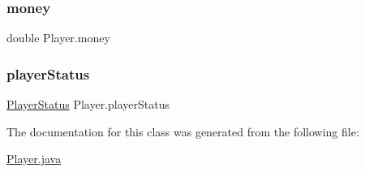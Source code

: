 \mbox{\label{class_player_a80b07966d9359181ae196aa4179930a5}} 
\subsubsection{\texorpdfstring{money}{money}}
{\footnotesize\ttfamily double Player.\+money\hspace{0.3cm}{\ttfamily [private]}}

\mbox{\label{class_player_a022b57fd4b98752acacbbc5d1ec35e45}} 
\subsubsection{\texorpdfstring{player\+Status}{playerStatus}}
{\footnotesize\ttfamily \mbox{\hyperlink{enum_player_1_1_player_status}{Player\+Status}} Player.\+player\+Status\hspace{0.3cm}{\ttfamily [private]}}



The documentation for this class was generated from the following file\+:\begin{DoxyCompactItemize}
\item 
\mbox{\hyperlink{_player_8java}{Player.\+java}}\end{DoxyCompactItemize}
